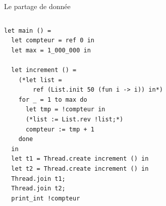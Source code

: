 \begin{frame}[fragile]{Le partage de donnée}
\begin{columns}
\begin{lstlisting}
let main () =
  let compteur = ref 0 in
  let max = 1_000_000 in
  
  let increment () =
    (*let list = 
        ref (List.init 50 (fun i -> i)) in*)
    for _ = 1 to max do
      let tmp = !compteur in
      (*list := List.rev !list;*)
      compteur := tmp + 1 
    done
  in
  let t1 = Thread.create increment () in
  let t2 = Thread.create increment () in
  Thread.join t1;
  Thread.join t2;
  print_int !compteur
\end{lstlisting}

\pause

\end{columns}
\end{frame}
